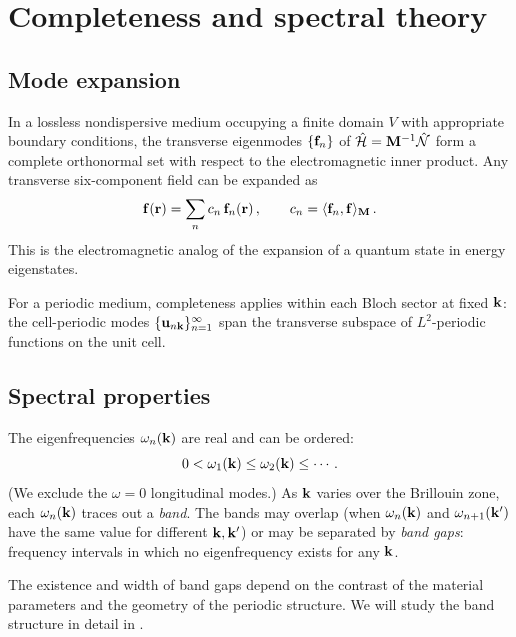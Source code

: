 \section{Completeness and spectral theory}
\label{sec:ch3-completeness} \cite{initio2026pdf}

\subsection{Mode expansion}
\label{sec:ch3-expansion}

In a lossless nondispersive medium occupying a finite domain $V$ with
appropriate boundary conditions, the transverse eigenmodes
$\{\mathbf{f}_n\}$ of $\hat{\mathcal{H}}=\mathbf{M}^{-1}\hat{\mathcal{N}}$ form a complete
orthonormal set with respect to the electromagnetic inner product.  Any
transverse six-component field can be expanded as
\begin{equation}\label{eq:ch3-mode-expansion}
  \mathbf{f}(\mathbf{r}) = \sum_n c_n\,\mathbf{f}_n(\mathbf{r})\,,
  \qquad
  c_n = \langle \mathbf{f}_n , \mathbf{f} \rangle_{\mathbf{M}}\,.
\end{equation}
This is the electromagnetic analog of the expansion of a quantum state
in energy eigenstates.

For a periodic medium, completeness applies within each Bloch sector
at fixed $\mathbf{k}$: the cell-periodic modes
$\{\mathbf{u}_{n\mathbf{k}}\}_{n=1}^{\infty}$ span the transverse subspace
of $L^2$-periodic functions on the unit cell.

\subsection{Spectral properties}
\label{sec:ch3-spectral}

The eigenfrequencies $\omega_n(\mathbf{k})$ are real and can be ordered:
\begin{equation}
  0 < \omega_1(\mathbf{k}) \leq \omega_2(\mathbf{k}) \leq \cdots\,.
\end{equation}
(We exclude the $\omega=0$ longitudinal modes.)  As $\mathbf{k}$ varies
over the Brillouin zone, each $\omega_n(\mathbf{k})$ traces out a
\emph{band}.  The bands may overlap (when $\omega_n(\mathbf{k})$ and
$\omega_{n+1}(\mathbf{k}')$ have the same value for different $\mathbf{k},\mathbf{k}'$)
or may be separated by \emph{band gaps}: frequency intervals in which
no eigenfrequency exists for any $\mathbf{k}$.

The existence and width of band gaps depend on the contrast of the
material parameters and the geometry of the periodic structure.  We will
study the band structure in detail in .


